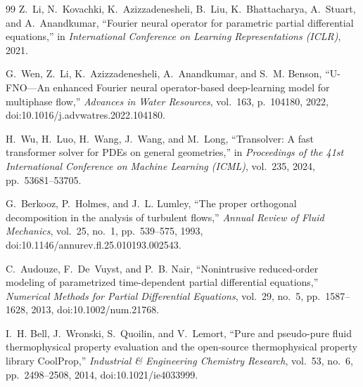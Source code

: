 \documentclass[11pt]{article}
\begin{document}
\begin{thebibliography}{99}
Z.~Li, N.~Kovachki, K.~Azizzadenesheli, B.~Liu, K.~Bhattacharya, A.~Stuart, and A.~Anandkumar, ``Fourier neural operator for parametric partial differential equations,'' in \emph{International Conference on Learning Representations (ICLR)}, 2021.

G.~Wen, Z.~Li, K.~Azizzadenesheli, A.~Anandkumar, and S.~M. Benson, ``U-FNO---An enhanced Fourier neural operator-based deep-learning model for multiphase flow,'' \emph{Advances in Water Resources}, vol.~163, p.~104180, 2022, doi:10.1016/j.advwatres.2022.104180.

H.~Wu, H.~Luo, H.~Wang, J.~Wang, and M.~Long, ``Transolver: A fast transformer solver for PDEs on general geometries,'' in \emph{Proceedings of the 41st International Conference on Machine Learning (ICML)}, vol.~235, 2024, pp.~53681--53705.

G.~Berkooz, P.~Holmes, and J.~L. Lumley, ``The proper orthogonal decomposition in the analysis of turbulent flows,'' \emph{Annual Review of Fluid Mechanics}, vol.~25, no.~1, pp.~539--575, 1993, doi:10.1146/annurev.fl.25.010193.002543.

C.~Audouze, F.~De~Vuyst, and P.~B. Nair, ``Nonintrusive reduced-order modeling of parametrized time-dependent partial differential equations,'' \emph{Numerical Methods for Partial Differential Equations}, vol.~29, no.~5, pp.~1587--1628, 2013, doi:10.1002/num.21768.

I.~H. Bell, J.~Wronski, S.~Quoilin, and V.~Lemort, ``Pure and pseudo-pure fluid thermophysical property evaluation and the open-source thermophysical property library CoolProp,'' \emph{Industrial \& Engineering Chemistry Research}, vol.~53, no.~6, pp.~2498--2508, 2014, doi:10.1021/ie4033999.

\end{thebibliography}
\end{document}
